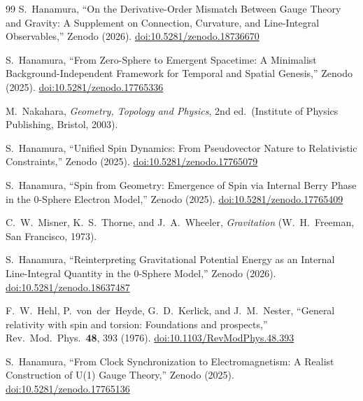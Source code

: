 \documentclass[%
 reprint,
 amsmath,amssymb,
 aps,
 prb,
]{revtex4-2}
\numberwithin{equation}{section}
\begin{document}
\begin{thebibliography}{99}
S.~Hanamura, ``On the Derivative-Order Mismatch Between Gauge Theory and Gravity: A Supplement on Connection, Curvature, and Line-Integral Observables,'' Zenodo (2026). \href{https://doi.org/10.5281/zenodo.18736670}{doi:10.5281/zenodo.18736670}

S.~Hanamura, ``From Zero-Sphere to Emergent Spacetime: A Minimalist Background-Independent Framework for Temporal and Spatial Genesis,'' Zenodo (2025). \href{https://doi.org/10.5281/zenodo.17765336}{doi:10.5281/zenodo.17765336}

M.~Nakahara, \textit{Geometry, Topology and Physics}, 2nd ed.\ (Institute of Physics Publishing, Bristol, 2003).

S.~Hanamura, ``Unified Spin Dynamics: From Pseudovector Nature to Relativistic Constraints,'' Zenodo (2025). \href{https://doi.org/10.5281/zenodo.17765079}{doi:10.5281/zenodo.17765079}

S.~Hanamura, ``Spin from Geometry: Emergence of Spin via Internal Berry Phase in the 0-Sphere Electron Model,'' Zenodo (2025). \href{https://doi.org/10.5281/zenodo.17765409}{doi:10.5281/zenodo.17765409}

C.~W.~Misner, K.~S.~Thorne, and J.~A.~Wheeler, \textit{Gravitation} (W.~H.~Freeman, San Francisco, 1973).

S.~Hanamura, ``Reinterpreting Gravitational Potential Energy as an Internal Line-Integral Quantity in the 0-Sphere Model,'' Zenodo (2026). \href{https://doi.org/10.5281/zenodo.18637487}{doi:10.5281/zenodo.18637487}

F.~W.~Hehl, P.~von~der~Heyde, G.~D.~Kerlick, and J.~M.~Nester, ``General relativity with spin and torsion: Foundations and prospects,'' Rev.\ Mod.\ Phys.\ \textbf{48}, 393 (1976). \href{https://doi.org/10.1103/RevModPhys.48.393}{doi:10.1103/RevModPhys.48.393}

S.~Hanamura, ``From Clock Synchronization to Electromagnetism: A Realist Construction of U(1) Gauge Theory,'' Zenodo (2025). \href{https://doi.org/10.5281/zenodo.17765136}{doi:10.5281/zenodo.17765136}

\end{thebibliography}


\appendix

\end{document}
